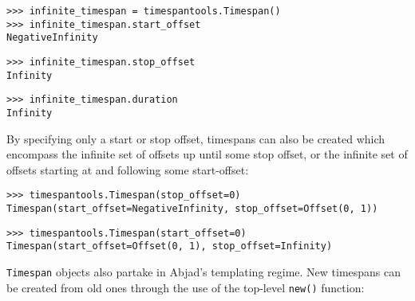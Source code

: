 \begin{comment}
<abjad>
infinite_timespan = timespantools.Timespan()
infinite_timespan.start_offset
infinite_timespan.stop_offset
infinite_timespan.duration
</abjad>
\end{comment}

\begin{singlespacing}
\vspace{-0.5\baselineskip}
\begin{lstlisting}
>>> infinite_timespan = timespantools.Timespan()
>>> infinite_timespan.start_offset
NegativeInfinity
\end{lstlisting}
\begin{lstlisting}
>>> infinite_timespan.stop_offset
Infinity
\end{lstlisting}
\begin{lstlisting}
>>> infinite_timespan.duration
Infinity
\end{lstlisting}
\end{singlespacing}

\noindent By specifying only a start or stop offset, timespans can also be
created which encompass the infinite set of offsets up until some stop offset,
or the infinite set of offsets starting at and following some start-offset:

\begin{comment}
<abjad>
timespantools.Timespan(stop_offset=0)
timespantools.Timespan(start_offset=0)
</abjad>
\end{comment}

\begin{singlespacing}
\vspace{-0.5\baselineskip}
\begin{lstlisting}
>>> timespantools.Timespan(stop_offset=0)
Timespan(start_offset=NegativeInfinity, stop_offset=Offset(0, 1))
\end{lstlisting}
\begin{lstlisting}
>>> timespantools.Timespan(start_offset=0)
Timespan(start_offset=Offset(0, 1), stop_offset=Infinity)
\end{lstlisting}
\end{singlespacing}

\noindent \texttt{Timespan} objects also partake in Abjad's templating regime.
New timespans can be created from old ones through the use of the top-level
\texttt{new()} function:

\begin{comment}
<abjad>
new(timespan, stop_offset=(5, 16))
</abjad>
\end{comment}

